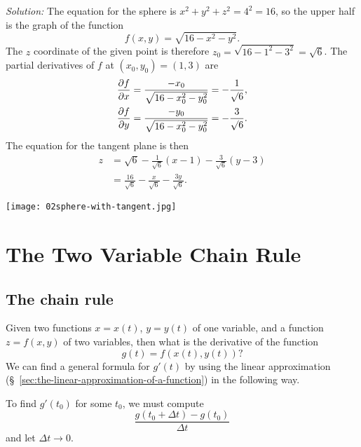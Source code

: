   \smallskip

\noindent%
\begin{minipage}{0.48\textwidth}
  \setlength\parindent{16pt}%
  \textit{\color{badgerred}Solution: } The equation for the sphere is
  $x^2+y^2+z^2 = 4^2 = 16$, so the upper half is the graph of the function
  \[
  f(x, y) = \sqrt{16 - x^2 - y^2}.
  \]
  The $z$ coordinate of the given point is therefore $z_0 = \sqrt{16-1^2-3^2} =
  \surd{6}$.  The partial derivatives of $f$ at $(x_0,y_0) = (1,3)$ are
  \begin{align*}
    \frac{\partial f}{\partial x}&= \frac{-x_0}{\sqrt{16 - x_0^2 - y_0^2}} = -\frac{1}{\surd6}, \\
    \frac{\partial f}{\partial y}&= \frac{-y_0}{\sqrt{16 - x_0^2 - y_0^2}} = -\frac{3}{\surd6}.
  \end{align*}
  The equation for the tangent plane is then
  \begin{align*}
    z &= \surd6 - \frac{1}{\surd6}(x-1) - \frac{3}{\surd6}(y-3)\\
    &=\frac{16}{\surd6} - \frac{x}{\surd6} - \frac{3y}{\surd6}.
  \end{align*}
\end{minipage}
\hfill
\begin{minipage}{0.48\textwidth}
  \texttt{[image: 02sphere-with-tangent.jpg]}
\end{minipage}

\section{The Two Variable Chain Rule}
\subsection{The chain rule}
\label{sec:chain-rule-derivation}
Given two functions $x=x(t)$, $y=y(t)$ of one variable, and a function $z=f(x,
y)$ of two variables, then what is the derivative of the function
\[
g(t) = f(x(t), y(t))?
\]
We can find a general formula for $g'(t)$ by using the linear approximation
(\S~\ref{sec:the-linear-approximation-of-a-function}) in the following way.

To find $g'(t_0)$ for some $t_0$, we must compute
\[
\frac{g(t_0 + \Delta t) - g(t_0)}{\Delta t}
\]
and let $\Delta t\to 0$.


